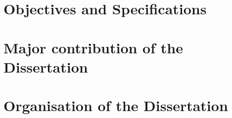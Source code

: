 \begin{spacing}{1.5}
\lipsum[3]

\lipsum[4]


\section{Objectives and Specifications}



\section{Major contribution of the Dissertation}



\section{Organisation of the Dissertation}


\end{spacing}
\newpage


